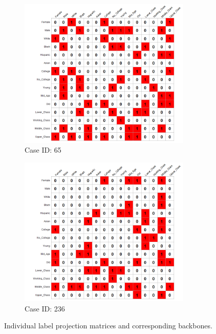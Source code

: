\documentclass[12pt]{article}
\begin{document}
\begin{figure}[t]
\begin{subfigure}[b]{0.49\textwidth}
            \label{fig:ind-ex-cp2}
    \end{subfigure}
     \begin{subfigure}[b]{0.49\textwidth}
        \includegraphics[trim={1cm 0cm 0cm 0cm},clip, width=0.9\textwidth]{Plots/data-ex-cbb1.png}
            \caption{Case ID: 65}
            \label{fig:ind-ex-cbb1}
    \end{subfigure}
     \begin{subfigure}[b]{0.49\textwidth}
        \includegraphics[trim={1cm 0cm 0cm 0cm},clip, width=0.9\textwidth]{Plots/data-ex-cbb2.png}
            \caption{Case ID: 236}
            \label{fig:ind-ex-cbb2}
    \end{subfigure}
    \caption{Individual label projection matrices and corresponding backbones.}
    \label{fig:ind-ex-cp}
\end{figure}
\end{document}
